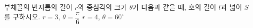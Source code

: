 부채꼴의 반지름의 길이 $r$와 중심각의 크기 $\theta$가 다음과 같을 때, 호의 길이 $l$과 넓이 $S$를 구하시오.
 $r=3$, $\theta=\dfrac{\pi}{6}$
 $r=4$, $\theta=60^\circ$
